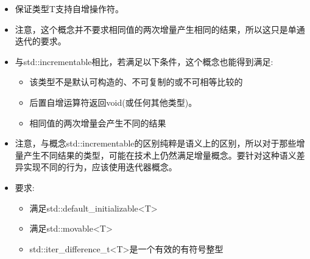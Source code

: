 
\begin{itemize}
\item
保证类型T支持自增操作符。

\item
注意，这个概念并不要求相同值的两次增量产生相同的结果，所以这只是单通迭代的要求。

\item
与std::incrementable相比，若满足以下条件，这个概念也能得到满足:

\begin{itemize}
\item
该类型不是默认可构造的、不可复制的或不可相等比较的

\item
后置自增运算符返回void(或任何其他类型)。

\item
相同值的两次增量会产生不同的结果
\end{itemize}

\item
注意，与概念std::incrementable的区别纯粹是语义上的区别，所以对于那些增量产生不同结果的类型，可能在技术上仍然满足增量概念。要针对这种语义差异实现不同的行为，应该使用迭代器概念。

\item
要求:
\begin{itemize}
\item
满足std::default\_initializable<T>

\item
满足std::movable<T>

\item
std::iter\_difference\_t<T>是一个有效的有符号整型
\end{itemize}
\end{itemize}


